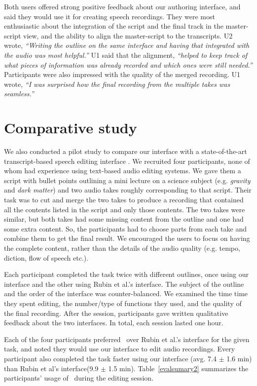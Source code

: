 Both users offered strong positive feedback about our authoring
interface, and said they would use it for creating speech recordings. They were most enthusiastic about the integration
of the script and the final track in the master-script view,
and the ability to align the master-script to the transcripts.
U2 wrote, \textit{``Writing the outline on the same interface and having
that integrated with the audio was most helpful.''}  U1 said
that the alignment, \textit{``helped to keep track of what pieces
of information was already recorded and which ones were still
needed.''} Participants were also impressed with the quality
of the merged recording. U1 wrote, \textit{``I was surprised
how the final recording from the multiple takes was seamless.''}  

\section{Comparative study}
We also conducted a pilot study to compare our interface with a state-of-the-art transcript-based speech editing interface \cite{rubin2013content}.  We recruited four participants, none of whom had experience using text-based audio editing systems. We gave them a script with bullet points outlining a mini lecture on a science subject (e.g. \textit{gravity} and \textit{dark matter}) and two audio takes roughly corresponding to that script. Their task was to cut and merge the two takes to produce a recording that contained all the contents listed in the script and only those contents. The two takes were similar, but both takes had some
missing content from the outline and one had some extra
content. So, the participants had to choose parts from each take and combine them to get the final result. We encouraged the users to focus on having the complete content, rather than the details of the audio quality (e.g. tempo, diction, flow of speech etc.). 

Each participant completed the task twice with different outlines, once using our interface and the other using Rubin et al.'s interface. The subject of the outline and the order of the interface was counter-balanced. We examined the time time they spent editing, the number/type of functions they used, and the quality of the final recording. After the session, participants gave written qualitative feedback about the two interfaces. In total, each session lasted one hour.
   
Each of the four participants preferred \systemname\ over Rubin et al.'s interface for the given task, and noted they would use our interface to edit audio recordings. Every participant also completed the task faster using our interface (avg. 7.4 $\pm$ 1.6 min) than Rubin et al's interface(9.9 $\pm$ 1.5 min). Table~\ref{evalsumary2} summarizes the participants' usage of \systemname\ during the editing session.


